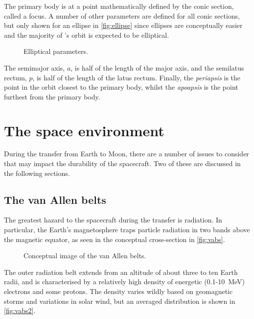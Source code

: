 The primary body is at a point mathematically defined by the conic section, called a focus. A number of other parameters are defined for all conic sections, but only shown for an ellipse in \autoref{fig:ellipse} since ellipses are conceptually easier and the majority of \BW's orbit is expected to be elliptical.

\begin{figure} 
\centering
\def\svgwidth{0.9\textwidth}

\caption{Elliptical parameters.} \label{fig:ellipse}
\end{figure}

The semimajor axis, $a$, is half of the length of the major axis, and the semilatus rectum, $p$, is half of the length of the latus rectum. Finally, the \emph{periapsis} is the point in the orbit closest to the primary body, whilst the \emph{apoapsis} is the point furthest from the primary body.


\section{The space environment} \label{sec:Environment}

During the transfer from Earth to Moon, there are a number of issues to consider that may impact the durability of the spacecraft. Two of these are discussed in the following sections.

\subsection{The van Allen belts} \label{sub:VABs}

The greatest hazard to the spacecraft during the transfer is radiation. In particular, the Earth's magnetosphere traps particle radiation in two bands above the magnetic equator, as seen in the conceptual cross-section in \autoref{fig:vabs}. 

\begin{figure}
\centering
\def\svgwidth{\figurewidth}

\caption{Conceptual image of the van Allen belts.} \label{fig:vabs}
\end{figure}

The outer radiation belt extends from an altitude of about three to ten Earth radii, and is characterised by a relatively high density of energetic (0.1-10~MeV) electrons and some protons. The density varies wildly based on geomagnetic storms and variations in solar wind, but an averaged distribution is shown in \autoref{fig:vabs2}.

